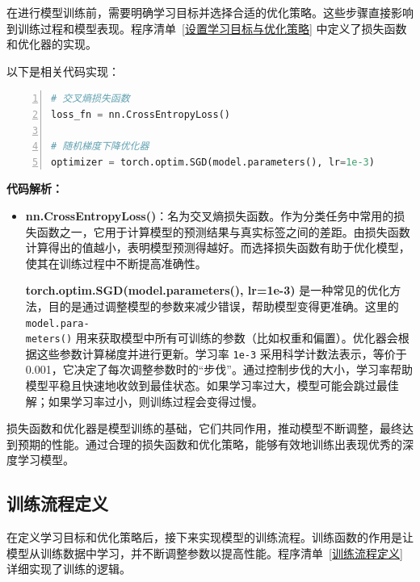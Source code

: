 在进行模型训练前，需要明确学习目标并选择合适的优化策略。这些步骤直接影响到训练过程和模型表现。程序清单~\ref{设置学习目标与优化策略} 中定义了损失函数和优化器的实现。

以下是相关代码实现：

\begin{lstlisting}[language={python},label={设置学习目标与优化策略},caption={设置学习目标与优化策略}, basicstyle=\footnotesize\ttfamily, breaklines=true, numbers=left, frame=single,keepspaces=true,showstringspaces=false]
# 交叉熵损失函数
loss_fn = nn.CrossEntropyLoss()  

# 随机梯度下降优化器
optimizer = torch.optim.SGD(model.parameters(), lr=1e-3)  
\end{lstlisting}

\textbf{代码解析：}
\begin{itemize}
    \item \textbf{nn.CrossEntropyLoss()}：名为交叉熵损失函数。作为分类任务中常用的损失函数之一，它用于计算模型的预测结果与真实标签之间的差距。由损失函数计算得出的值越小，表明模型预测得越好。而选择损失函数有助于优化模型，使其在训练过程中不断提高准确性。

    \textbf{torch.optim.SGD(model.parameters(), lr=1e-3)} 是一种常见的优化方法，目的是通过调整模型的参数来减少错误，帮助模型变得更准确。这里的 \texttt{model.para-\\meters()} 用来获取模型中所有可训练的参数（比如权重和偏置）。优化器会根据这些参数计算梯度并进行更新。学习率 \texttt{1e-3} 采用科学计数法表示，等价于 0.001，它决定了每次调整参数时的“步伐”。通过控制步伐的大小，学习率帮助模型平稳且快速地收敛到最佳状态。如果学习率过大，模型可能会跳过最佳解；如果学习率过小，则训练过程会变得过慢。

\end{itemize}

损失函数和优化器是模型训练的基础，它们共同作用，推动模型不断调整，最终达到预期的性能。通过合理的损失函数和优化策略，能够有效地训练出表现优秀的深度学习模型。


\subsection{训练流程定义}
在定义学习目标和优化策略后，接下来实现模型的训练流程。训练函数的作用是让模型从训练数据中学习，并不断调整参数以提高性能。程序清单~\ref{训练流程定义} 详细实现了训练的逻辑。

